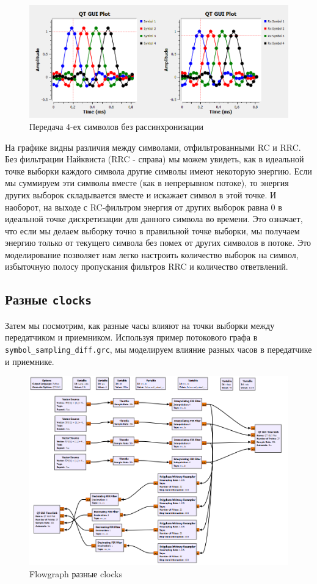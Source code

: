 \documentclass[a4paper, 14pt]{extarticle}
\begin{document}
    \begin{figure}[H]
        \centering
        \includegraphics[width=0.8\linewidth]{isi_problem}
        \caption{Передача 4-ех символов без рассинхронизации}
        \label{fig:isi_problem}
    \end{figure}

    На графике видны различия между символами, отфильтрованными RC и RRC.
    Без фильтрации Найквиста (RRC - справа) мы можем увидеть, как в идеальной точке выборки каждого символа другие символы имеют некоторую энергию.
    Если мы суммируем эти символы вместе (как в непрерывном потоке), то энергия других выборок складывается вместе и искажает символ в этой точке.
    И наоборот, на выходе с RC-фильтром энергия от других выборок равна 0 в идеальной точке дискретизации для данного символа во времени.
    Это означает, что если мы делаем выборку точно в правильной точке выборки, мы получаем энергию только от текущего символа без помех от других символов в потоке.
    Это моделирование позволяет нам легко настроить количество выборок на символ, избыточную полосу пропускания фильтров RRC и количество ответвлений.

    \subsection{Разные \texttt{clocks}}

    Затем мы посмотрим, как разные часы влияют на точки выборки между передатчиком и приемником.
    Используя пример потокового графа в \texttt{symbol\_sampling\_diff.grc}, мы моделируем влияние разных часов в передатчике и приемнике.

    \begin{figure}[H]
        \centering
        \includegraphics[width=0.8\linewidth]{flowgraph_diff_clocks}
        \caption{Flowgraph разные clocks}
        \label{fig:flowgraph_diff_clocks}
    \end{figure}
\end{document}
